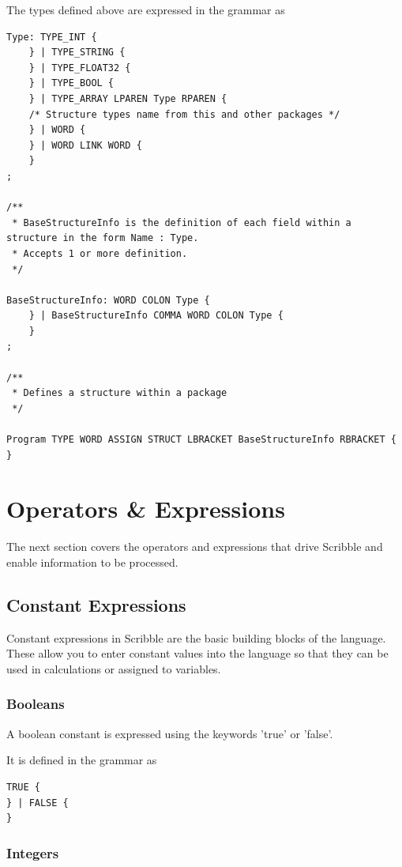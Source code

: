 \documentclass[]{final_report}
\begin{document}
The types defined above are expressed in the grammar as
\begin{verbatim}
Type: TYPE_INT {
	} | TYPE_STRING {
	} | TYPE_FLOAT32 {
	} | TYPE_BOOL {
	} | TYPE_ARRAY LPAREN Type RPAREN {
	/* Structure types name from this and other packages */	
	} | WORD {
	} | WORD LINK WORD {
	}
;

/**
 * BaseStructureInfo is the definition of each field within a structure in the form Name : Type.
 * Accepts 1 or more definition.
 */

BaseStructureInfo: WORD COLON Type {		
	} | BaseStructureInfo COMMA WORD COLON Type {
	}
;

/**
 * Defines a structure within a package
 */
 
Program TYPE WORD ASSIGN STRUCT LBRACKET BaseStructureInfo RBRACKET {
}

\end{verbatim}

\section{Operators \& Expressions}

The next section covers the operators and expressions that drive Scribble and enable information to be processed.

\subsection{Constant Expressions}

Constant expressions in Scribble are the basic building blocks of the language. These allow you to enter constant values into the language so that they can be used in calculations or assigned to variables.

\subsubsection{Booleans}

A boolean constant is expressed using the keywords 'true' or 'false'.

It is defined in the grammar as
\begin{verbatim}
TRUE {
} | FALSE {
}\end{verbatim}

\subsubsection{Integers}
\end{document}
